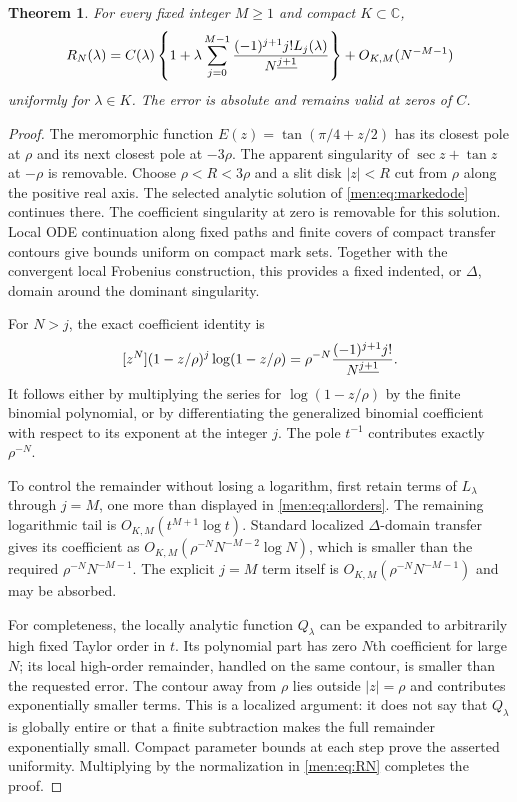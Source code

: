 \documentclass[11pt,letterpaper]{article}
\newtheorem{theorem}{Theorem}[section]
\theoremstyle{remark}\newtheorem{remark}[theorem]{Remark}
\newcommand{\CC}{\mathbb C}\newcommand{\NN}{\mathbb N}
\begin{document}
\begin{theorem}\label{men:thm:transfer}
For every fixed integer $M\ge1$ and compact $K\subset\CC$,
\begin{equation}\label{men:eq:allorders}
 R_N(\lambda)=C(\lambda)\left\{1+\lambda
 \sum_{j=0}^{M-1}\frac{(-1)^{j+1}j!L_j(\lambda)}{N^{\underline{j+1}}}\right\}
       +O_{K,M}(N^{-M-1})
\end{equation}
uniformly for $\lambda\in K$. The error is absolute and remains valid at zeros of $C$.
\end{theorem}
\begin{proof}
The meromorphic function $E(z)=\tan(\pi/4+z/2)$ has its closest pole at $\rho$ and its next closest pole at $-3\rho$. The apparent singularity of $\sec z+\tan z$ at $-\rho$ is removable. Choose $\rho<R<3\rho$ and a slit disk $|z|<R$ cut from $\rho$ along the positive real axis. The selected analytic solution of \eqref{men:eq:markedode} continues there. The coefficient singularity at zero is removable for this solution. Local ODE continuation along fixed paths and finite covers of compact transfer contours give bounds uniform on compact mark sets. Together with the convergent local Frobenius construction, this provides a fixed indented, or $\Delta$, domain around the dominant singularity.

For $N>j$, the exact coefficient identity is
\begin{equation}\label{men:eq:logcoefficient}
 [z^N](1-z/\rho)^j\log(1-z/\rho)
 =\rho^{-N}\frac{(-1)^{j+1}j!}{N^{\underline{j+1}}}.
\end{equation}
It follows either by multiplying the series for $\log(1-z/\rho)$ by the finite binomial polynomial, or by differentiating the generalized binomial coefficient with respect to its exponent at the integer $j$. The pole $t^{-1}$ contributes exactly $\rho^{-N}$.

To control the remainder without losing a logarithm, first retain terms of $L_\lambda$ through $j=M$, one more than displayed in \eqref{men:eq:allorders}. The remaining logarithmic tail is $O_{K,M}(t^{M+1}\log t)$. Standard localized $\Delta$-domain transfer~\cite{fo,fs} gives its coefficient as
$O_{K,M}(\rho^{-N}N^{-M-2}\log N)$, which is smaller than the required $\rho^{-N}N^{-M-1}$. The explicit $j=M$ term itself is $O_{K,M}(\rho^{-N}N^{-M-1})$ and may be absorbed.

For completeness, the locally analytic function $Q_\lambda$ can be expanded to arbitrarily high fixed Taylor order in $t$. Its polynomial part has zero $N$th coefficient for large $N$; its local high-order remainder, handled on the same contour, is smaller than the requested error. The contour away from $\rho$ lies outside $|z|=\rho$ and contributes exponentially smaller terms. This is a localized argument: it does not say that $Q_\lambda$ is globally entire or that a finite subtraction makes the full remainder exponentially small. Compact parameter bounds at each step prove the asserted uniformity. Multiplying by the normalization in \eqref{men:eq:RN} completes the proof.
\end{proof}
\end{document}
